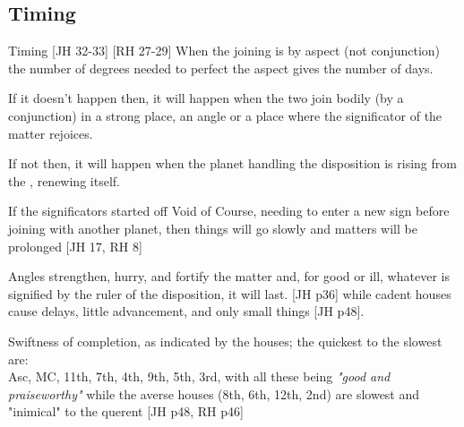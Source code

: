 \subsection{Timing}
\begin{frame}[t]{Timing  [JH 32-33] [RH 27-29]}
When the joining is by aspect (not conjunction) the number of degrees needed to perfect the aspect gives the number of days.

If it doesn't happen then, it will happen when the two join bodily (by a conjunction) in a strong place, an angle or a place where the significator of the matter rejoices.

If not then, it will happen when the planet handling the disposition is rising from the \Sun, renewing itself.

If the significators started off Void of Course, needing to enter a new sign before joining with  another planet, then things will go slowly and matters will be prolonged [JH 17, RH 8]

Angles strengthen, hurry, and fortify the matter and, for good or ill, whatever is signified by the ruler of the disposition, it will last. [JH p36] while cadent houses cause delays, little advancement, and only small things [JH p48].

Swiftness of completion, as indicated by the houses; the quickest to the slowest are: \\
Asc, MC, 11th, 7th, 4th, 9th, 5th, 3rd,  with all these being \textsl{"good and praiseworthy"} while the averse houses (8th, 6th, 12th, 2nd) are slowest and "inimical" to the querent [JH p48, RH p46]

\end{frame}